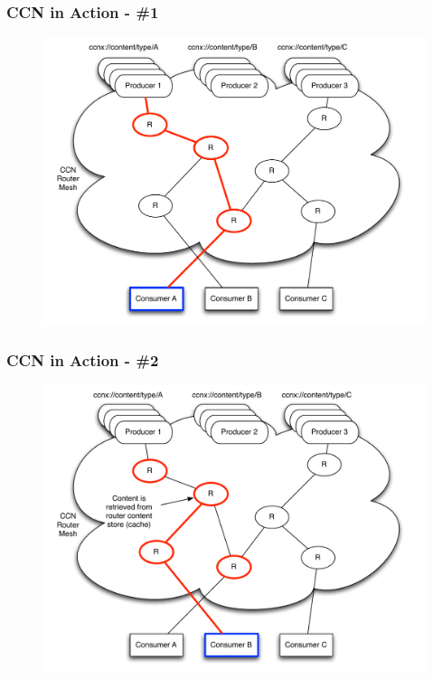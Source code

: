 \documentclass[handout]{beamer}
\begin{document}
\begin{frame}
	\frametitle{CCN in Action - \#1}
	\begin{figure}[h]
		\includegraphics[scale=0.4]{img/ccn_img1.pdf}
	\end{figure}
\end{frame}

\begin{frame}
	\frametitle{CCN in Action - \#2}
	\begin{figure}[h]
		\includegraphics[scale=0.4]{img/ccn_img2.pdf}
	\end{figure}
\end{frame}
\end{document}
